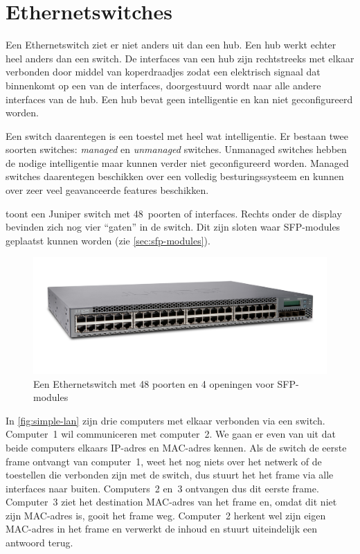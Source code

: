 \section{Ethernetswitches}

Een Ethernetswitch ziet er niet anders uit dan een hub.
Een hub werkt echter heel anders dan een switch.
De interfaces van een hub zijn rechtstreeks met elkaar verbonden door middel van koperdraadjes zodat een elektrisch signaal dat binnenkomt op een van de interfaces, doorgestuurd wordt naar alle andere interfaces van de hub.
Een hub bevat geen intelligentie en kan niet geconfigureerd worden.

Een switch daarentegen is een toestel met heel wat intelligentie.
Er bestaan twee soorten switches: \emph{managed} en \emph{unmanaged} switches.
Unmanaged switches hebben de nodige intelligentie maar kunnen verder niet geconfigureerd worden.
Managed switches daarentegen beschikken over een volledig besturingssysteem en kunnen over zeer veel geavanceerde features beschikken.

 toont een Juniper switch met 48~poorten of interfaces.
Rechts onder de display bevinden zich nog vier ``gaten'' in de switch.
Dit zijn sloten waar SFP-modules geplaatst kunnen worden (zie \vref{sec:sfp-modules}).

\begin{figure}
    \centering
    \includegraphics[width=\textwidth]{images/ethernetswitch.jpg}
    \caption{Een Ethernetswitch met 48 poorten en 4 openingen voor SFP-modules}
    \label{fig:ethernetswitch}
\end{figure}


In \vref{fig:simple-lan} zijn drie computers met elkaar verbonden via een switch.
Computer~1 wil communiceren met computer~2.
We gaan er even van uit dat beide computers elkaars IP-adres en MAC-adres kennen.
Als de switch de eerste frame ontvangt van computer~1, weet het nog niets over het netwerk of de toestellen die verbonden zijn met de switch, dus stuurt het het frame via alle interfaces naar buiten.
Computers~2 en~3 ontvangen dus dit eerste frame.
Computer~3 ziet het destination MAC-adres van het frame en, omdat dit niet zijn MAC-adres is, gooit het frame weg.
Computer~2 herkent wel zijn eigen MAC-adres in het frame en verwerkt de inhoud en stuurt uiteindelijk een antwoord terug.

